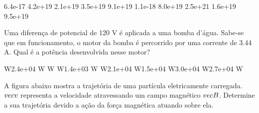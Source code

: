 \documentclass[12pt, addpoints]{exam}
\begin{document}
\begin{questions}
\begin{multicols*}{2}
\begin{oneparchoices}
\choice 6.4e-17 \choice 4.2e+19 \choice 2.1e+19 \choice 3.5e+19 \choice 9.1e+19 \choice 1.1e-18 \choice 8.0e+19 \choice 2.5e+21 \choice 1.6e+19 \choice 9.5e+19 
\end{oneparchoices}\question Uma diferença de potencial de 120 V é aplicada a uma bomba d’água. Sabe-se que em funcionamento, o motor da bomba é percorrido por uma corrente de    3.44 A. Qual é a potência desenvolvida nesse motor?

\begin{oneparchoices}
 W\choice 2.4e+04 W W W\choice 1.4e+03 W W\choice 2.1e+04 W\choice 1.5e+04 W\choice 3.0e+04 W\choice 2.7e+04 W
\end{oneparchoices}\question A ﬁgura abaixo mostra a trajetória de uma partícula eletricamente carregada. $\\vec{{v}}$ representa a velocidade atravessando um campo magnético $\\vec{{B}}$. Determine a sua trajetória devido a ação da força magnética atuando sobre ela.
        
        \begin{center}
            \begin{minipage}[c]{0.5\linewidth}
            \end{minipage}
        \end{center}


\end{multicols*}
\end{questions}
\end{document}
